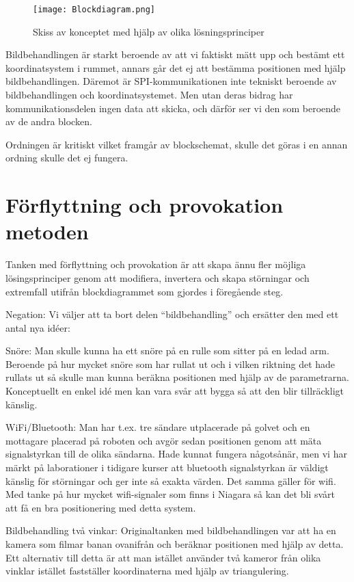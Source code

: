 \documentclass[11pt, a4paper]{report}
\begin{document}
\begin{figure}[H]
	\begin{center}
		\texttt{[image: Blockdiagram.png]}
		\caption{Skiss av konceptet med hjälp av olika lösningsprinciper}
		\label{fig:blockdiagram}
	\end{center}
\end{figure}

Bildbehandlingen är starkt beroende av att vi faktiskt mätt upp och bestämt ett koordinatsystem i rummet, annars går det ej att bestämma positionen med hjälp bildbehandlingen. Däremot är SPI-kommunikationen inte tekniskt beroende av bildbehandlingen och koordinatsystemet. Men utan deras bidrag har kommunikationsdelen ingen data att skicka, och därför ser vi den som beroende av de andra blocken.

Ordningen är kritiskt vilket framgår av blockschemat, skulle det göras i en annan ordning skulle det ej fungera. 


\section{Förflyttning och provokation metoden}

Tanken med förflyttning och provokation är att skapa ännu fler möjliga lösingsprinciper genom att modifiera, invertera och skapa störningar och extremfall utifrån blockdiagrammet som gjordes i föregående steg. 

Negation:
Vi väljer att ta bort delen “bildbehandling” och ersätter den med ett antal nya idéer:

Snöre:
Man skulle kunna ha ett snöre på en rulle som sitter på en ledad arm. Beroende på hur mycket snöre som har rullat ut och i vilken riktning det hade rullats ut så skulle man kunna beräkna positionen med hjälp av de parametrarna.
Konceptuellt en enkel idé men kan vara svår att bygga så att den blir tillräckligt känslig.

WiFi/Bluetooth: 
Man har t.ex. tre sändare utplacerade på golvet och en mottagare placerad på roboten och avgör sedan positionen genom att mäta signalstyrkan till de olika sändarna. 
Hade kunnat fungera någotsånär, men vi har märkt på laborationer i tidigare kurser att bluetooth signalstyrkan är väldigt känslig för störningar och ger inte så exakta värden. Det samma gäller för wifi. Med tanke på hur mycket wifi-signaler som finns i Niagara så kan det bli svårt att få en bra positionering med detta system.

Bildbehandling två vinkar:
Originaltanken med bildbehandlingen var att ha en kamera som filmar banan ovanifrån och beräknar positionen med hjälp av detta. Ett alternativ till detta är att man istället använder två kameror från olika vinklar istället fastställer koordinaterna med hjälp av triangulering.
\end{document}
